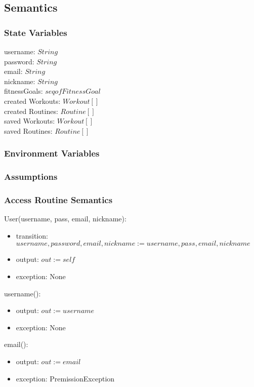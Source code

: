 \documentclass[12pt, titlepage]{article}
\begin{document}
\subsection{Semantics}

\subsubsection{State Variables}
username: $String$ \\
password: $String$ \\
email: $String$ \\
nickname: $String$ \\
fitnessGoals: $seq of FitnessGoal$ \\
created Workouts: $Workout[]$ \\
created Routines: $Routine[]$ \\
saved Workouts: $Workout[]$ \\
saved Routines: $Routine[]$ \\

\subsubsection{Environment Variables}

\subsubsection{Assumptions}

\subsubsection{Access Routine Semantics}

User(username, pass, email, nickname):
\begin{itemize}
	\item transition: $username, password, email, nickname := username, pass, email, nickname$
	\item output: $out := self$
	\item exception: None
\end{itemize}

username():
\begin{itemize}
	\item output: $out := username$
	\item exception: None
\end{itemize}

email():
\begin{itemize}
	\item output: $out := email$
	\item exception: PremissionException
\end{itemize}
\end{document}

